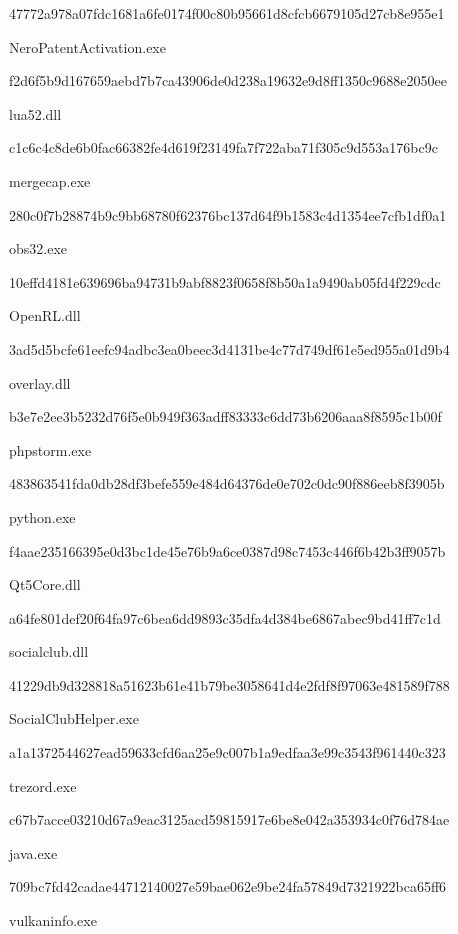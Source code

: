 \documentclass[czech,master,dept460,male,cpp,cpdeclaration]{diploma}
\begin{document}
\noindent
47772a978a07fdc1681a6fe0174f00c80b95661d8cfcb6679105d27cb8e955e1

NeroPatentActivation.exe

\noindent
f2d6f5b9d167659aebd7b7ca43906de0d238a19632e9d8ff1350c9688e2050ee

lua52.dll

\noindent
c1c6c4c8de6b0fac66382fe4d619f23149fa7f722aba71f305c9d553a176bc9c

mergecap.exe

\noindent
280c0f7b28874b9c9bb68780f62376bc137d64f9b1583c4d1354ee7cfb1df0a1

obs32.exe

\noindent
10effd4181e639696ba94731b9abf8823f0658f8b50a1a9490ab05fd4f229cdc

OpenRL.dll

\noindent
3ad5d5bcfe61eefc94adbc3ea0beec3d4131be4c77d749df61e5ed955a01d9b4

overlay.dll

\noindent
b3e7e2ee3b5232d76f5e0b949f363adff83333c6dd73b6206aaa8f8595c1b00f

phpstorm.exe

\noindent
483863541fda0db28df3befe559e484d64376de0e702c0dc90f886eeb8f3905b

python.exe

\noindent
f4aae235166395e0d3bc1de45e76b9a6ce0387d98c7453c446f6b42b3ff9057b

Qt5Core.dll

\noindent
a64fe801def20f64fa97c6bea6dd9893c35dfa4d384be6867abec9bd41ff7c1d

socialclub.dll

\noindent
41229db9d328818a51623b61e41b79be3058641d4e2fdf8f97063e481589f788

SocialClubHelper.exe

\noindent
a1a1372544627ead59633cfd6aa25e9c007b1a9edfaa3e99c3543f961440c323

trezord.exe

\noindent
c67b7acce03210d67a9eac3125acd59815917e6be8e042a353934c0f76d784ae

java.exe

\noindent
709bc7fd42cadae44712140027e59bae062e9be24fa57849d7321922bca65ff6

vulkaninfo.exe
\end{document}
